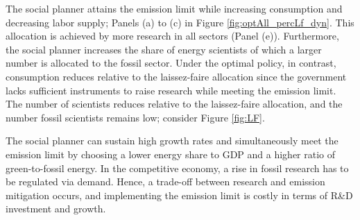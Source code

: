 \begin{figure}[h!!!]
\end{figure} 
%
The social planner attains the emission limit while increasing consumption and decreasing labor supply; Panels (a) to (c) in Figure \ref{fig:optAll_percLf_dyn}. This allocation is achieved by more research in all sectors (Panel (e)). Furthermore, the social planner increases the share of energy scientists of which a larger number is allocated to the fossil sector. 
Under the optimal policy, in contrast, consumption reduces relative to the laissez-faire allocation since the government lacks sufficient instruments to raise research while meeting the emission limit. The number of scientists reduces relative to the laissez-faire allocation, and the number fossil scientists remains low; consider Figure \ref{fig:LF}.

The social planner can sustain  high growth rates and simultaneously meet the emission limit by choosing a lower energy share to GDP and a higher ratio of green-to-fossil energy. 
In the competitive economy, a rise in fossil research has to be regulated via demand. Hence, a trade-off between research and emission mitigation occurs, and implementing the emission limit is costly in terms of R\&D investment and growth. 


